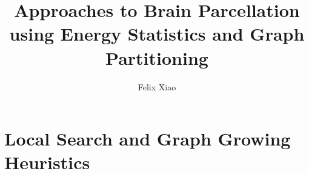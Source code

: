 \documentclass{report}
\title{Approaches to Brain Parcellation using Energy Statistics and Graph Partitioning}
\author{Felix Xiao}
\begin{document}
\maketitle
\tableofcontents

%

%

%

\chapter{Local Search and Graph Growing Heuristics}


%

%



\end{document}
